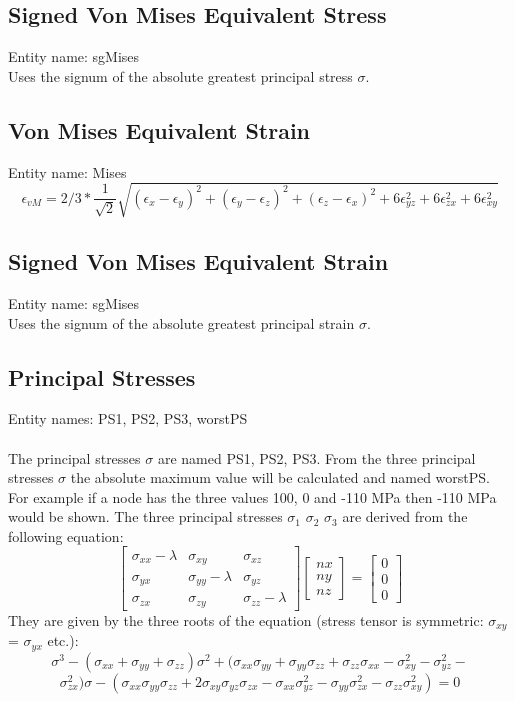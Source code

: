 \documentclass{article}
\begin{document}
\subsection{\label{Signed Von Mises Equivalent Stress}Signed Von Mises Equivalent Stress}
Entity name: sgMises\\
Uses the signum of the absolute greatest principal stress $\sigma$.

\subsection{\label{Von Mises Equivalent Strain}Von Mises Equivalent Strain}
Entity name: Mises\\
\[  \epsilon_{vM} = 2/3 * \frac{1}{\sqrt{2}} \sqrt{(\epsilon_{x}-\epsilon_{y})^{2}+(\epsilon_{y}-\epsilon_{z})^{2}+(\epsilon_{z}-\epsilon_{x})^{2}+6\epsilon_{yz}^{2}+6\epsilon_{zx}^{2}+6\epsilon_{xy}^{2}} \]

\subsection{\label{Signed Von Mises Equivalent Strain}Signed Von Mises Equivalent Strain}
Entity name: sgMises\\
Uses the signum of the absolute greatest principal strain $\sigma$.

\subsection{\label{Principal Stresses}Principal Stresses}
Entity names: PS1, PS2, PS3, worstPS\\\\
The principal stresses $\sigma$ are named PS1, PS2, PS3. From the three principal stresses $\sigma$ the absolute maximum value will be calculated and named worstPS. For example if a node has the three values 100, 0 and -110 MPa then -110 MPa would be shown. The three principal stresses $\sigma_{1}$ $\sigma_{2}$ $\sigma_{3}$ are derived from the following equation:
\[
\left [
\begin{array}{ccc}
\sigma_{xx}-\lambda & \sigma_{xy} & \sigma_{xz}\\
\sigma_{yx} & \sigma_{yy}-\lambda & \sigma_{yz}\\
\sigma_{zx} & \sigma_{zy} & \sigma_{zz}-\lambda
\end{array}
\right ]
\left [
\begin{array}{c}
nx\\
ny\\
nz
\end{array}
\right ]
= 
\left [
\begin{array}{c}
0\\
0\\
0
\end{array}
\right ]
\]
They are given by the three roots of the equation (stress tensor is symmetric: $\sigma_{xy}$ = $\sigma_{yx}$ etc.):
\[ \sigma^3 - (\sigma_{xx}+\sigma_{yy}+\sigma_{zz})\sigma^2 + (\sigma_{xx}\sigma_{yy}+\sigma_{yy}\sigma_{zz}+\sigma_{zz}\sigma_{xx}-\sigma_{xy}^2-\sigma_{yz}^2-\]\[\sigma_{zx}^2)\sigma - (\sigma_{xx}\sigma_{yy}\sigma_{zz}+2\sigma_{xy}\sigma_{yz}\sigma_{zx}-\sigma_{xx}\sigma_{yz}^2-\sigma_{yy}\sigma_{zx}^2-\sigma_{zz}\sigma_{xy}^2)  = 0 \]
\end{document}
